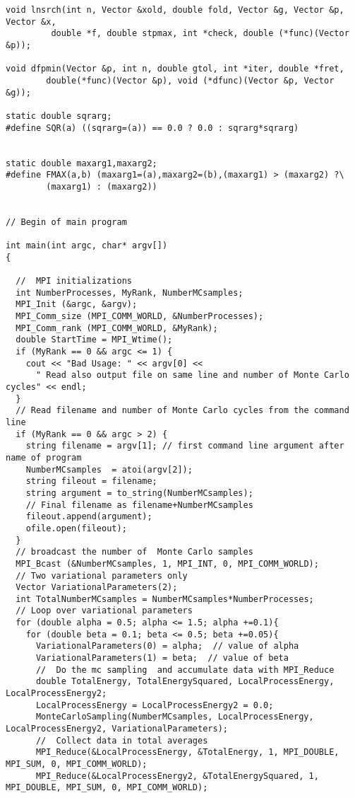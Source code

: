 \documentclass[%
oneside,                 %
final,                   %
10pt]{article}
\begin{document}
\begin{verbatim}
void lnsrch(int n, Vector &xold, double fold, Vector &g, Vector &p, Vector &x,
		 double *f, double stpmax, int *check, double (*func)(Vector &p));

void dfpmin(Vector &p, int n, double gtol, int *iter, double *fret,
	    double(*func)(Vector &p), void (*dfunc)(Vector &p, Vector &g));

static double sqrarg;
#define SQR(a) ((sqrarg=(a)) == 0.0 ? 0.0 : sqrarg*sqrarg)


static double maxarg1,maxarg2;
#define FMAX(a,b) (maxarg1=(a),maxarg2=(b),(maxarg1) > (maxarg2) ?\
        (maxarg1) : (maxarg2))


// Begin of main program   

int main(int argc, char* argv[])
{

  //  MPI initializations
  int NumberProcesses, MyRank, NumberMCsamples;
  MPI_Init (&argc, &argv);
  MPI_Comm_size (MPI_COMM_WORLD, &NumberProcesses);
  MPI_Comm_rank (MPI_COMM_WORLD, &MyRank);
  double StartTime = MPI_Wtime();
  if (MyRank == 0 && argc <= 1) {
    cout << "Bad Usage: " << argv[0] << 
      " Read also output file on same line and number of Monte Carlo cycles" << endl;
  }
  // Read filename and number of Monte Carlo cycles from the command line
  if (MyRank == 0 && argc > 2) {
    string filename = argv[1]; // first command line argument after name of program
    NumberMCsamples  = atoi(argv[2]);
    string fileout = filename;
    string argument = to_string(NumberMCsamples);
    // Final filename as filename+NumberMCsamples
    fileout.append(argument);
    ofile.open(fileout);
  }
  // broadcast the number of  Monte Carlo samples
  MPI_Bcast (&NumberMCsamples, 1, MPI_INT, 0, MPI_COMM_WORLD);
  // Two variational parameters only
  Vector VariationalParameters(2);
  int TotalNumberMCsamples = NumberMCsamples*NumberProcesses; 
  // Loop over variational parameters
  for (double alpha = 0.5; alpha <= 1.5; alpha +=0.1){
    for (double beta = 0.1; beta <= 0.5; beta +=0.05){
      VariationalParameters(0) = alpha;  // value of alpha
      VariationalParameters(1) = beta;  // value of beta
      //  Do the mc sampling  and accumulate data with MPI_Reduce
      double TotalEnergy, TotalEnergySquared, LocalProcessEnergy, LocalProcessEnergy2;
      LocalProcessEnergy = LocalProcessEnergy2 = 0.0;
      MonteCarloSampling(NumberMCsamples, LocalProcessEnergy, LocalProcessEnergy2, VariationalParameters);
      //  Collect data in total averages
      MPI_Reduce(&LocalProcessEnergy, &TotalEnergy, 1, MPI_DOUBLE, MPI_SUM, 0, MPI_COMM_WORLD);
      MPI_Reduce(&LocalProcessEnergy2, &TotalEnergySquared, 1, MPI_DOUBLE, MPI_SUM, 0, MPI_COMM_WORLD);

\end{verbatim}
\end{document}
